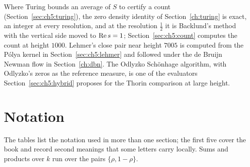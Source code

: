 Where Turing bounds an average of $S$ to certify a count (Section~\ref{sec:ch5:turing}), the zero density identity of Section~\ref{ch:turing} is exact, an integer at every resolution, and at the resolution $\frac12$ it is Backlund's method with the vertical side moved to $\operatorname{Re} s=1$; Section~\ref{sec:ch5:count} computes the count at height $1000$. Lehmer's close pair near height $7005$ \cite{Lehmer56} is computed from the P\'olya kernel in Section~\ref{sec:ch5:lehmer} and followed under the de Bruijn Newman flow in Section~\ref{ch:dbn}. The Odlyzko Sch\"onhage algorithm, with Odlyzko's zeros as the reference measure, is one of the evaluators Section~\ref{sec:ch5:hybrid} proposes for the Thorin comparison at large height.

\chapter{Notation}\label{app:notation}

The tables list the notation used in more than one section; the first five cover the book and record second meanings that some letters carry locally. Sums and products over $k$ run over the pairs $\{\rho,1-\rho\}$.

